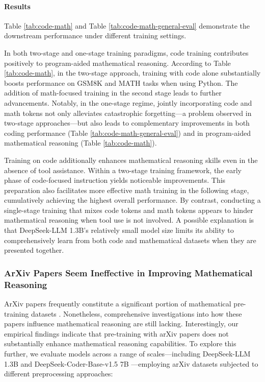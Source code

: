 \begin{itemize}[topsep=0pt]
\begin{itemize}[topsep=0pt]
\paragraph{Results}
Table \ref{tab:code-math} and Table \ref{tab:code-math-general-eval} demonstrate the downstream performance under different training settings.

In both two-stage and one-stage training paradigms, code training contributes positively to program-aided mathematical reasoning. According to Table \ref{tab:code-math}, in the two-stage approach, training with code alone substantially boosts performance on GSM8K and MATH tasks when using Python. The addition of math-focused training in the second stage leads to further advancements. Notably, in the one-stage regime, jointly incorporating code and math tokens not only alleviates catastrophic forgetting—a problem observed in two-stage approaches—but also leads to complementary improvements in both coding performance (Table \ref{tab:code-math-general-eval}) and in program-aided mathematical reasoning (Table \ref{tab:code-math}).

Training on code additionally enhances mathematical reasoning skills even in the absence of tool assistance. Within a two-stage training framework, the early phase of code-focused instruction yields noticeable improvements. This preparation also facilitates more effective math training in the following stage, cumulatively achieving the highest overall performance. By contrast, conducting a single-stage training that mixes code tokens and math tokens appears to hinder mathematical reasoning when tool use is not involved. A possible explanation is that DeepSeek-LLM 1.3B’s relatively small model size limits its ability to comprehensively learn from both code and mathematical datasets when they are presented together.

\subsubsection{ArXiv Papers Seem Ineffective in Improving Mathematical Reasoning}

ArXiv papers frequently constitute a significant portion of mathematical pre-training datasets \citep{minerva,gpt-f,llemma,mathpile}. Nonetheless, comprehensive investigations into how these papers influence mathematical reasoning are still lacking. Interestingly, our empirical findings indicate that pre-training with arXiv papers does not substantially enhance mathematical reasoning capabilities. To explore this further, we evaluate models across a range of scales—including DeepSeek-LLM 1.3B and DeepSeek-Coder-Base-v1.5 7B \citep{deepseek-coder}—employing arXiv datasets subjected to different preprocessing approaches:


\end{itemize}
\end{itemize}
